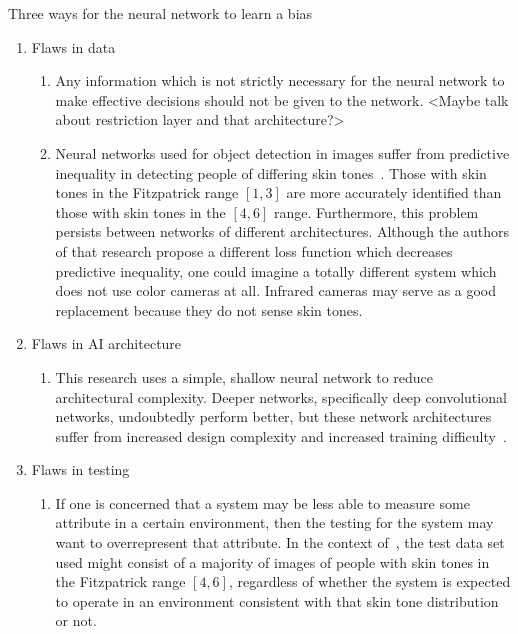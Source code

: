 \documentclass{report}
\begin{document}
Three ways for the neural network to learn a bias
\begin{enumerate}
    \item Flaws in data
    \begin{enumerate}
        \item Any information which is not strictly necessary for the neural network to make
        effective decisions should not be given to the network. <Maybe talk about restriction layer
        and that architecture?>

        \item Neural networks used for object detection in images suffer from predictive inequality
        in detecting people of differing skin tones~\cite{wilson2019predictive}. Those with skin
        tones in the Fitzpatrick range $[1, 3]$ are more accurately identified than those with skin
        tones in the $[4, 6]$ range. Furthermore, this problem persists between networks of
        different architectures. Although the authors of that research propose a different loss
        function which decreases predictive inequality, one could imagine a totally different system
        which does not use color cameras at all. Infrared cameras may serve as a good replacement
        because they do not sense skin tones.
    \end{enumerate}
    
    \item Flaws in AI architecture
    \begin{enumerate}
        \item This research uses a simple, shallow neural network to reduce architectural
        complexity. Deeper networks, specifically deep convolutional networks, undoubtedly perform
        better, but these network architectures suffer from increased design complexity and
        increased training difficulty~\cite{mhaskar2016deep}.
    \end{enumerate}
    
    \item Flaws in testing
    \begin{enumerate}
        \item If one is concerned that a system may be less able to measure some attribute in a
        certain environment, then the testing for the system may want to overrepresent that
        attribute. In the context of~\cite{wilson2019predictive}, the test data set used might
        consist of a majority of images of people with skin tones in the Fitzpatrick range $[4, 6]$,
        regardless of whether the system is expected to operate in an environment consistent with
        that skin tone distribution or not.


\end{enumerate}
\end{enumerate}
\end{document}
